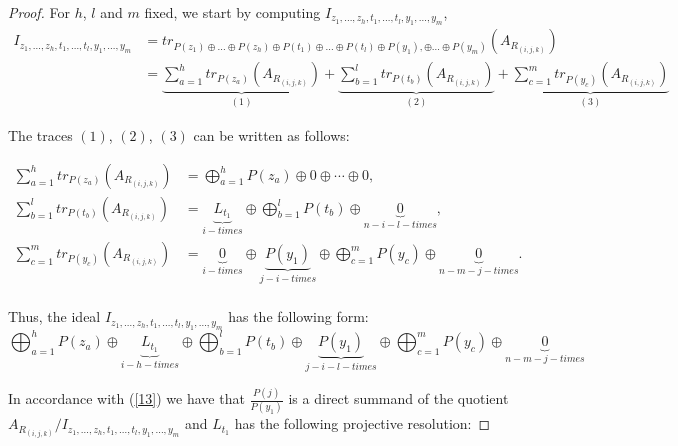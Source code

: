 \documentclass[10pt,twoside]{article}
\theoremstyle{definition}
\begin{document}
\begin{proof}
For $h$, $l$ and $m$ fixed, we start by computing $I_{z_1,\ldots, z_h, t_1, \ldots ,t_l, y_1, \ldots , y_m}$,  
\begin{equation}\label{*}
\begin{split}
I_{z_1,\ldots, z_h, t_1, \ldots ,t_l, y_1,\ldots , y_m}&=tr_{P(z_1)\oplus \ldots \oplus P(z_h)\oplus P(t_1) \oplus \ldots \oplus P(t_l)\oplus P(y_1), \oplus \ldots \oplus P(y_m)}(A_{R_{(i, j, k)}}) \\
&= \underbrace{\displaystyle \sum_{a=1}^{h}tr_{P(z_a)}(A_{R_{(i, j, k)}})}_{(1)} + \underbrace{\displaystyle \sum_{b=1}^{l}tr_{P(t_b)}(A_{R_{(i, j, k)}})}_{(2)} + \underbrace{\displaystyle \sum_{c=1}^{m}tr_{P(y_c)}(A_{R_{(i, j, k)}})}_{(3)}
\end{split}
\end{equation}





The traces $(1)$, $(2)$, $(3)$  can be written as follows:

\begin{equation}
\begin{split}
\displaystyle \sum_{a=1}^{h}tr_{P(z_a)}(A_{R_{(i, j, k)}})&=\bigoplus_{a=1}^{h}P(z_a)\oplus 0 \oplus \cdots \oplus 0, \\
\displaystyle \sum_{b=1}^{l}tr_{P(t_b)}(A_{R_{(i, j, k)}})&= \underbrace{L_{t_1}}_{i- times}\oplus  \bigoplus_{b=1}^{l} P(t_b) \oplus\underbrace{0}_{n-i-l-times},\\
\displaystyle \sum_{c=1}^{m}tr_{P(y_c)}(A_{R_{(i, j, k)}})&= \underbrace{0}_{i- times}\oplus\underbrace{P(y_1)}_{j-i - times} \oplus \bigoplus_{c=1}^{m} P(y_c) \oplus\underbrace{0}_{n-m-j-times}.\\
\end{split}
\end{equation}

Thus, the ideal  $I_{z_1,\ldots, z_h, t_1, \ldots ,t_l, y_1,\ldots , y_m}$ has the following form:
\begin{equation}\label{13}
\bigoplus_{a=1}^{h}P(z_a) \oplus \underbrace{L_{t_1}}_{i-h-times}\oplus \bigoplus_{b=1}^{l}P(t_b)\oplus \underbrace{P(y_1)}_{j-i-l-times} \oplus \bigoplus_{c=1}^{m}P(y_c)\oplus \underbrace{0}_{n-m-j- times}
\end{equation}

In accordance with (\ref{13}) we have that $\frac{P(j)}{P(y_1)}$ is a direct summand of the quotient $A_{R_{(i, j, k)}}/I_{z_1,\ldots, z_h, t_1, \ldots ,t_l, y_1,\ldots , y_m}$ and $L_{t_1}$ has the following projective resolution:


\end{proof}
\end{document}
